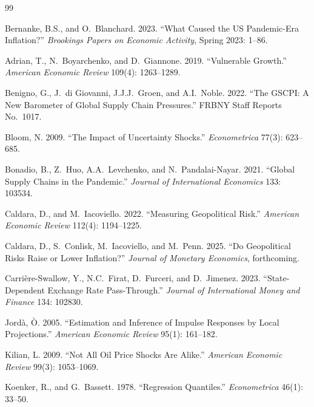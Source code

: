 \documentclass[12pt]{article}
\begin{document}

\begin{thebibliography}{99}

Bernanke, B.S., and O.~Blanchard. 2023.
``What Caused the US Pandemic-Era Inflation?''
\textit{Brookings Papers on Economic Activity}, Spring 2023: 1--86.

Adrian, T., N.~Boyarchenko, and D.~Giannone. 2019.
``Vulnerable Growth.'' \textit{American Economic Review}
109(4): 1263--1289.

Benigno, G., J.~di Giovanni, J.J.J.~Groen, and A.I.~Noble. 2022.
``The GSCPI: A New Barometer of Global Supply Chain Pressures.''
FRBNY Staff Reports No.\ 1017.

Bloom, N. 2009. ``The Impact of Uncertainty Shocks.''
\textit{Econometrica} 77(3): 623--685.

Bonadio, B., Z.~Huo, A.A.~Levchenko, and N.~Pandalai-Nayar. 2021.
``Global Supply Chains in the Pandemic.''
\textit{Journal of International Economics} 133: 103534.

Caldara, D., and M.~Iacoviello. 2022.
``Measuring Geopolitical Risk.''
\textit{American Economic Review} 112(4): 1194--1225.

Caldara, D., S.~Conlisk, M.~Iacoviello, and M.~Penn. 2025.
``Do Geopolitical Risks Raise or Lower Inflation?''
\textit{Journal of Monetary Economics}, forthcoming.

Carri\`{e}re-Swallow, Y., N.C.~Firat, D.~Furceri, and D.~Jimenez. 2023.
``State-Dependent Exchange Rate Pass-Through.''
\textit{Journal of International Money and Finance} 134: 102830.

Jord\`{a}, \`{O}. 2005.
``Estimation and Inference of Impulse Responses by Local Projections.''
\textit{American Economic Review} 95(1): 161--182.

Kilian, L. 2009.
``Not All Oil Price Shocks Are Alike.''
\textit{American Economic Review} 99(3): 1053--1069.

Koenker, R., and G.~Bassett. 1978.
``Regression Quantiles.'' \textit{Econometrica} 46(1): 33--50.


\end{thebibliography}
\end{document}
